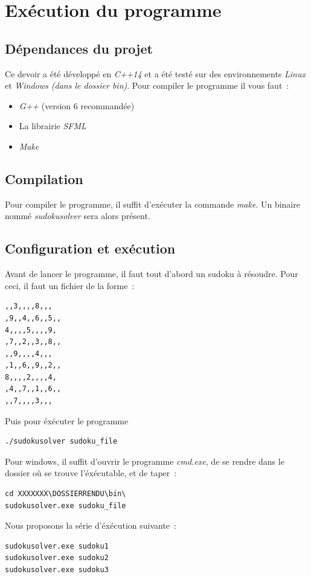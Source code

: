 \documentclass{article}
\begin{document}
\section{Exécution du programme}
\subsection{Dépendances du projet}
Ce devoir a été développé en \emph{C++14} et a été testé sur des environnements
\emph{Linux} et \emph{Windows (dans le dossier bin)}. Pour compiler le
programme il vous faut~:
\begin{itemize}
    \item \emph{G++} (version 6 recommandée)
    \item La librairie \emph{SFML}
    \item \emph{Make}
\end{itemize}
\subsection{Compilation}
Pour compiler le programme, il suffit d'exécuter la commande \emph{make}. Un
binaire nommé \emph{sudokusolver} sera alors présent.

\subsection{Configuration et exécution}

Avant de lancer le programme, il faut tout d'abord un sudoku à résoudre. Pour ceci, il faut un fichier de la forme~:

\begin{verbatim}
,,3,,,,8,,,
,9,,4,,6,,5,,
4,,,,5,,,,9,
,7,,2,,3,,8,,
,,9,,,,4,,,
,1,,6,,9,,2,,
8,,,,2,,,,4,
,4,,7,,1,,6,,
,,7,,,,3,,,
\end{verbatim}

Puis pour éxécuter le programme
\begin{verbatim}
./sudokusolver sudoku_file
\end{verbatim}

Pour windows, il suffit d'ouvrir le programme \emph{cmd.exe}, de se rendre dans le dossier où se trouve l'éxécutable, et de taper~:
\begin{verbatim}
cd XXXXXXX\DOSSIERRENDU\bin\
sudokusolver.exe sudoku_file
\end{verbatim}

Nous proposons la série d'éxécution suivante~:
\begin{verbatim}
sudokusolver.exe sudoku1
sudokusolver.exe sudoku2
sudokusolver.exe sudoku3
\end{verbatim}
\end{document}
